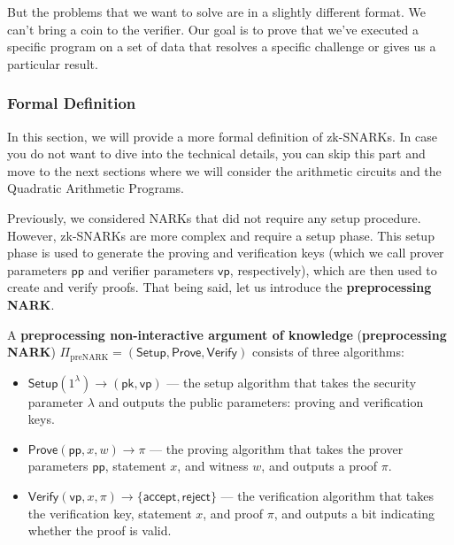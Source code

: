 \documentclass[../lecture-notes.tex]{subfiles}
\begin{document}
But the problems that we want to solve are in a slightly different format. We can't bring a coin to
the verifier. Our goal is to prove that we've executed a specific program on a set of data that 
resolves a specific challenge or gives us a particular result.

\subsubsection{Formal Definition}

In this section, we will provide a more formal definition of zk-SNARKs. In case you do not want to
dive into the technical details, you can skip this part and move to the next sections where we will
consider the arithmetic circuits and the Quadratic Arithmetic Programs.

Previously, we considered NARKs that did not require any setup procedure. However, zk-SNARKs are
more complex and require a setup phase. This setup phase is used to generate the proving and
verification keys (which we call prover parameters $\mathsf{pp}$ and verifier parameters $\mathsf{vp}$, respectively), 
which are then used to create and verify proofs. That being said, let us introduce the \textbf{preprocessing NARK}.

\begin{definition}
    A \textbf{preprocessing non-interactive argument of knowledge} (\textbf{preprocessing NARK}) $\Pi_{\text{preNARK}}=(\mathsf{Setup},\mathsf{Prove},\mathsf{Verify})$ consists of three algorithms:
    \begin{itemize}
        \item $\mathsf{Setup}(1^\lambda) \rightarrow (\mathsf{pk}, \mathsf{vp})$ --- the setup algorithm that takes the security parameter $\lambda$ and outputs the public parameters: proving and verification keys.
        \item $\mathsf{Prove}(\mathsf{pp}, x, w) \rightarrow \pi$ --- the proving algorithm that takes the prover parameters $\mathsf{pp}$, statement $x$, and witness $w$, and outputs a proof $\pi$.
        \item $\mathsf{Verify}(\mathsf{vp}, x, \pi) \rightarrow \{\mathsf{accept}, \mathsf{reject}\}$ --- the verification algorithm that takes the verification key, statement $x$, and proof $\pi$, and outputs a bit indicating whether the proof is valid.
    \end{itemize}
\end{definition}
\end{document}
